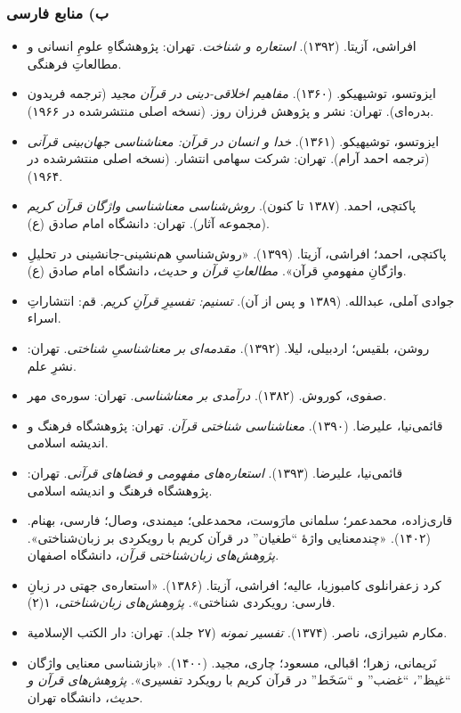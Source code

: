 \begin{RTL}
\begin{otherlanguage}{persian}
\subsubsection{ب) منابع
فارسی}\label{ux628-ux645ux646ux627ux628ux639-ux641ux627ux631ux633ux6cc}

\begin{itemize}
\tightlist
\item
  افراشی، آزیتا. (۱۳۹۲). \emph{استعاره و شناخت}. تهران: پژوهشگاهِ علومِ
  انسانی و مطالعاتِ فرهنگی.
\item
  ایزوتسو، توشیهیکو. (۱۳۶۰). \emph{مفاهیم اخلاقی-دینی در قرآن مجید}
  (ترجمه فریدون بدره‌ای). تهران: نشر و پژوهش فرزان روز. (نسخه اصلی
  منتشرشده در ۱۹۶۶).
\item
  ایزوتسو، توشیهیکو. (۱۳۶۱). \emph{خدا و انسان در قرآن: معناشناسی
  جهان‌بینی قرآنی} (ترجمه احمد آرام). تهران: شرکت سهامی انتشار. (نسخه
  اصلی منتشرشده در ۱۹۶۴).
\item
  پاکتچی، احمد. (۱۳۸۷ تا کنون). \emph{روش‌شناسی معناشناسی واژگان قرآن
  کریم} (مجموعه آثار). تهران: دانشگاه امام صادق (ع).
\item
  پاکتچی، احمد؛ افراشی، آزیتا. (۱۳۹۹). «روش‌شناسیِ هم‌نشینی-جانشینی در
  تحلیلِ واژگانِ مفهومیِ قرآن». \emph{مطالعاتِ قرآن و حدیث}، دانشگاه امام
  صادق (ع).
\item
  جوادی آملی، عبدالله. (۱۳۸۹ و پس از آن). \emph{تسنیم: تفسیرِ قرآنِ کریم}.
  قم: انتشاراتِ اسراء.
\item
  روشن، بلقیس؛ اردبیلی، لیلا. (۱۳۹۲). \emph{مقدمه‌ای بر معناشناسیِ
  شناختی}. تهران: نشرِ علم.
\item
  صفوی، کوروش. (۱۳۸۲). \emph{درآمدی بر معناشناسی}. تهران: سوره‌ی مهر.
\item
  قائمی‌نیا، علیرضا. (۱۳۹۰). \emph{معناشناسی شناختی قرآن}. تهران:
  پژوهشگاه فرهنگ و اندیشه اسلامی.
\item
  قائمی‌نیا، علیرضا. (۱۳۹۳). \emph{استعاره‌های مفهومی و فضاهای قرآنی}.
  تهران: پژوهشگاه فرهنگ و اندیشه اسلامی.
\item
  قاری‌زاده، محمدعمر؛ سلمانی مارَوست، محمدعلی؛ میمندی، وصال؛ فارسی، بهنام.
  (۱۴۰۲). «چندمعنایی واژۀ ``طغیان'' در قرآن کریم با رویکردی بر
  زبان‌شناختی». \emph{پژوهش‌های زبان‌شناختی قرآن}، دانشگاه اصفهان.
\item
  کرد زعفرانلوی کامبوزیا، عالیه؛ افراشی، آزیتا. (۱۳۸۶). «استعاره‌ی جهتی
  در زبانِ فارسی: رویکردی شناختی». \emph{پژوهش‌های زبان‌شناختی}، ۱(۲).
\item
  مکارم شیرازی، ناصر. (۱۳۷۴). \emph{تفسیر نمونه} (۲۷ جلد). تهران: دار
  الکتب الإسلامیة.
\item
  نَریمانی، زهرا؛ اقبالی، مسعود؛ چاری، مجید. (۱۴۰۰). «بازشناسی معنایی
  واژگان ``غیظ''، ``غضب'' و ``سَخَط'' در قرآن کریم با رویکرد تفسیری».
  \emph{پژوهش‌های قرآن و حدیث}، دانشگاه تهران.
\end{itemize}


\end{otherlanguage}
\end{RTL}
